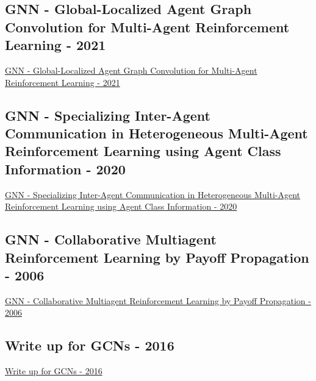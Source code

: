 \subsection{GNN - Global-Localized Agent Graph Convolution for Multi-Agent Reinforcement Learning - 2021}
\href{https://ieeexplore.ieee.org/abstract/document/9414993}{GNN - Global-Localized Agent Graph Convolution for Multi-Agent Reinforcement Learning - 2021}

\subsection{GNN - Specializing Inter-Agent Communication in Heterogeneous Multi-Agent Reinforcement Learning using Agent Class Information - 2020}
\href{https://arxiv.org/abs/2012.07617}{GNN - Specializing Inter-Agent Communication in Heterogeneous Multi-Agent Reinforcement Learning using Agent Class Information - 2020}

\subsection{GNN - Collaborative Multiagent Reinforcement Learning by Payoff Propagation - 2006}
\href{https://dl.acm.org/doi/abs/10.5555/1248547.1248612}{GNN - Collaborative Multiagent Reinforcement Learning by Payoff Propagation - 2006}

\subsection{Write up for GCNs - 2016}
\href{https://tkipf.github.io/graph-convolutional-networks/}{Write up for GCNs - 2016}


